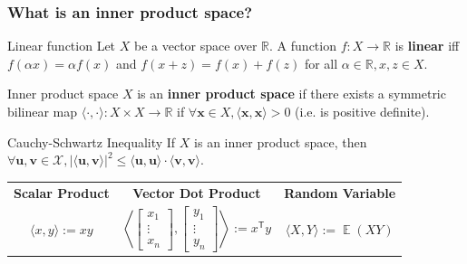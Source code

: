 \documentclass{beamer}
\begin{document}
    \begin{frame}
        \frametitle{What is an inner product space?}

        \begin{block}{Linear function}
            Let $X$ be a vector space over $\mathbb R$. A function $f: X \rightarrow \mathbb R$ is \textbf{linear} iff $f(\alpha x)= \alpha f(x)$
            and $f(x+z)=f(x)+f(z)$ for all $\alpha\in\mathbb R, x,z \in X$.
        \end{block}

        \begin{block}{Inner product space}
            $X$ is an \textbf{inner product space} if there exists a symmetric bilinear map $\langle \cdot ,\cdot \rangle :X\times X\to \mathbb R$ if $\forall \mathbf x \in X, \langle \mathbf x,\mathbf x \rangle > 0$ (i.e. is positive definite).
        \end{block}
        \begin{block}{Cauchy-Schwartz Inequality}
            If $X$ is an inner product space, then $\forall \mathbf u, \mathbf v \in \mathcal X, |\langle\mathbf u, \mathbf v\rangle|^2 \leq \langle \mathbf u, \mathbf u\rangle\cdot\langle\mathbf v, \mathbf v\rangle$.
        \end{block}
        \begin{center}
            \begin{tabular}{ c c c }
                \textbf{Scalar Product} & \textbf{Vector Dot Product} & \textbf{Random Variable} \\
                $\langle x,y\rangle := xy$ &
                $\left\langle {\begin{bmatrix}
                                   x_{1}\\\vdots \\x_{n}
                \end{bmatrix}},{\begin{bmatrix}
                                    y_{1}\\\vdots \\y_{n}
                \end{bmatrix}}\right\rangle :=x^{\textsf {T}}y$ &
                $\langle X,Y\rangle :=\operatorname {\mathbb E} (XY)$
            \end{tabular}
        \end{center}
    \end{frame}
\end{document}
